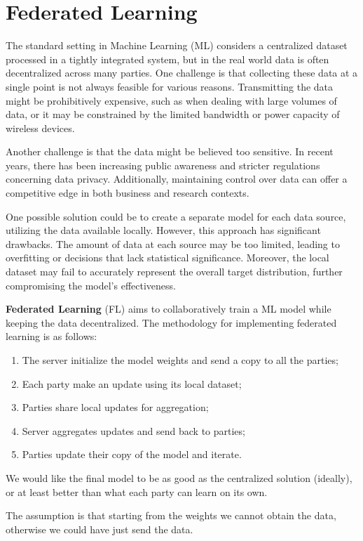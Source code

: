 \chapter{Federated Learning}
The standard setting in Machine Learning (ML) considers a centralized dataset
processed in a tightly integrated system, but in the real world data is often
decentralized across many parties. One challenge is that collecting these data
at a single point is not always feasible for various reasons. Transmitting the
data might be prohibitively expensive, such as when dealing with large volumes
of data, or it may be constrained by the limited bandwidth or power capacity of
wireless devices.

Another challenge is that the data might be believed too sensitive. In recent
years, there has been increasing public awareness and stricter regulations
concerning data privacy. Additionally, maintaining control over data can offer a
competitive edge in both business and research contexts.

One possible solution could be to create a separate model for each data source,
utilizing the data available locally. However, this approach has significant
drawbacks. The amount of data at each source may be too limited, leading to
overfitting or decisions that lack statistical significance. Moreover, the
local dataset may fail to accurately represent the overall target distribution,
further compromising the model's effectiveness.

\textbf{Federated Learning} (FL) aims to collaboratively train a ML model while
keeping the data decentralized. The methodology for implementing federated
learning is as follows:
\begin{enumerate}
    \item The server initialize the model weights and send a copy to all the parties;
    \item Each party make an update using its local dataset;
    \item Parties share local updates for aggregation;
    \item Server aggregates updates and send back to parties;
    \item Parties update their copy of the model and iterate.
\end{enumerate}

We would like the final model to be as good as the centralized solution (ideally),
or at least better than what each party can learn on its own.

\begin{note}
    The assumption is that starting from the weights we cannot obtain the data,
    otherwise we could have just send the data.
\end{note}

